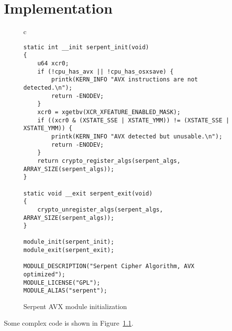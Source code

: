 %
% 


\chapter{Implementation}
\label{sec:implementation}



\begin{figure}
\centering
\begin{tabular}{c}
\begin{lstlisting}
static int __init serpent_init(void)
{
    u64 xcr0;
    if (!cpu_has_avx || !cpu_has_osxsave) {
        printk(KERN_INFO "AVX instructions are not detected.\n");
        return -ENODEV;
    }
    xcr0 = xgetbv(XCR_XFEATURE_ENABLED_MASK);
    if ((xcr0 & (XSTATE_SSE | XSTATE_YMM)) != (XSTATE_SSE | XSTATE_YMM)) {
        printk(KERN_INFO "AVX detected but unusable.\n");
        return -ENODEV;
    }
    return crypto_register_algs(serpent_algs, ARRAY_SIZE(serpent_algs));
}

static void __exit serpent_exit(void)
{
    crypto_unregister_algs(serpent_algs, ARRAY_SIZE(serpent_algs));
}

module_init(serpent_init);
module_exit(serpent_exit);

MODULE_DESCRIPTION("Serpent Cipher Algorithm, AVX optimized");
MODULE_LICENSE("GPL");
MODULE_ALIAS("serpent");
\end{lstlisting}
\end{tabular}
\caption{Serpent AVX module initialization}
\label{fig:serpent_init}
\end{figure}

Some complex code is shown in Figure~\ref{fig:serpent_init}. 


